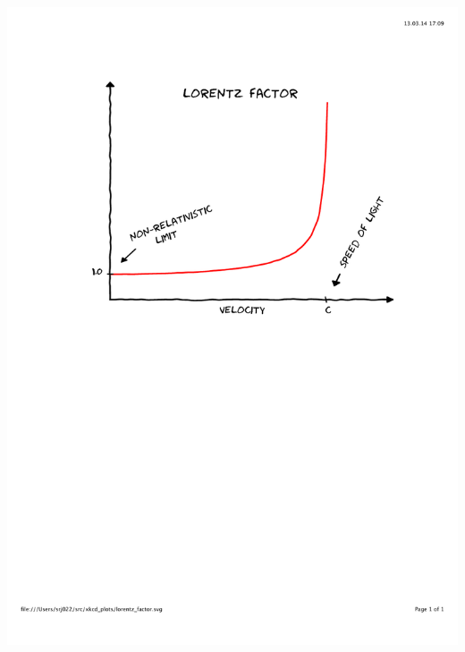 \documentclass[mathserif,8pt]{beamer}
\begin{document}
\begin{frame}
\begin{columns}
\begin{column}{.40\textwidth}
	\includegraphics[viewport = 100 400 550 750, clip, scale=0.25]{figures/lorentz_factor.pdf}\\
	\ \\
	\ \\
	\ \\
	\ \\
	\ \\
	\ \\

\end{column}
\end{columns}
\end{frame}
\end{document}
